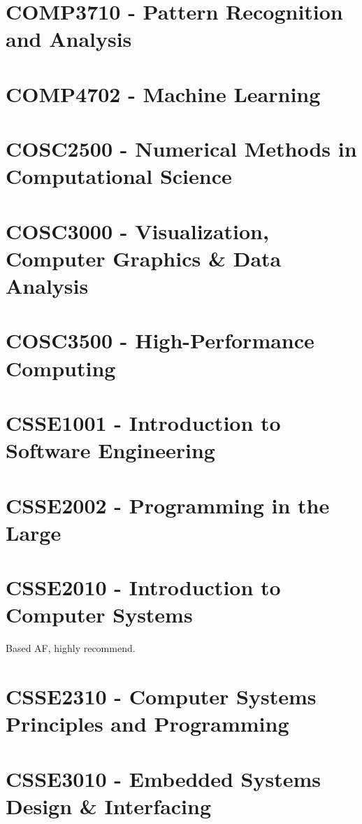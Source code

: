 \documentclass[a4paper,12pt]{report}
\begin{document}
\hypertarget{COMP3710}{\section{COMP3710 - Pattern Recognition and Analysis}}

\hypertarget{COMP4702}{\section{COMP4702 - Machine Learning}}

\hypertarget{COSC2500}{\section{COSC2500 - Numerical Methods in Computational Science}}

\hypertarget{COSC3000}{\section{COSC3000 - Visualization, Computer Graphics \& Data Analysis}}

\hypertarget{COSC3500}{\section{COSC3500 - High-Performance Computing}}

\hypertarget{CSSE1001}{\section{CSSE1001 - Introduction to Software Engineering}}

\hypertarget{CSSE2002}{\section{CSSE2002 - Programming in the Large}}

\hypertarget{CSSE2010}{\section{CSSE2010 - Introduction to Computer Systems}}
Based AF, highly recommend.

\hypertarget{CSSE2310}{\section{CSSE2310 - Computer Systems Principles and Programming}}

\hypertarget{CSSE3010}{\section{CSSE3010 - Embedded Systems Design \& Interfacing}}
\end{document}
